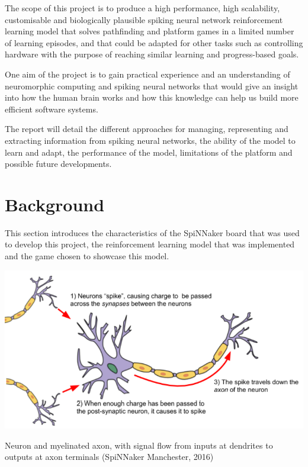\documentclass[10pt]{article}
\begin{document}
    The scope of this project is to produce a high performance, high scalability, customisable and biologically plausible spiking neural network reinforcement learning model that solves pathfinding and platform games in a limited number of learning episodes, and that could be adapted for other tasks such as controlling hardware with the purpose of reaching similar learning and progress-based goals.

    One aim of the project is to gain practical experience and an understanding of neuromorphic computing and spiking neural networks that would give an insight into how the human brain works and how this knowledge can help us build more efficient software systems.

    The report will detail the different approaches for managing, representing and extracting information from spiking neural networks, the ability of the model to learn and adapt, the performance of the model, limitations of the platform and possible future developments.

    \newpage
    \section{Background}

    This section introduces the characteristics of the SpiNNaker board that was used to develop this project, the reinforcement learning model that was implemented and the game chosen to showcase this model.

    \begin{suppfigure*}[b]
    \center
    \includegraphics[width=149mm]{./neurons.png}
    \caption{Neuron and myelinated axon, with signal flow from inputs at dendrites to outputs at axon terminals (SpiNNaker Manchester, 2016)}
    \label{fig:neurons}
    \end{suppfigure*}
\end{document}
